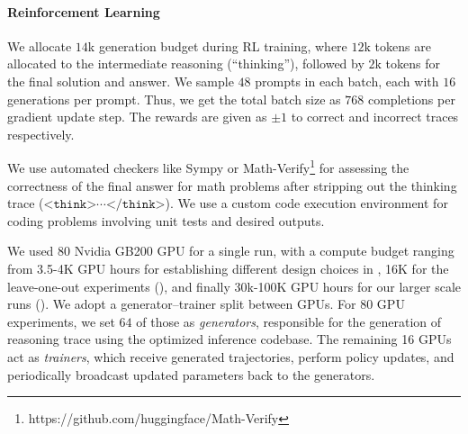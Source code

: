 \documentclass[]{fairmeta} %
\begin{document}
\paragraph{Reinforcement Learning}
We allocate $14$k generation budget during RL training, where $12\text{k}$ tokens are allocated to the intermediate reasoning (``thinking''), followed by $2\text{k}$ tokens for the final solution and answer. We sample $48$ prompts in each batch, each with $16$ generations per prompt. Thus, we get the total batch size as $768$ completions per gradient update step. The rewards are given as $\pm 1$ to correct and incorrect traces respectively.

We use automated checkers like Sympy \citep{meurer2017sympy} or Math-Verify\footnote{https://github.com/huggingface/Math-Verify} for assessing the correctness of the final answer for math problems after stripping out the thinking trace ($\texttt{<think>}\cdots\texttt{</think>}$). We use a custom code execution environment for coding problems involving unit tests and desired outputs.

We used 80 Nvidia GB200 GPU for a single run, with a compute budget ranging from 3.5-4K GPU hours for establishing different design choices in , 16K for the leave-one-out experiments (), and finally 30k-100K GPU hours for our larger scale runs (). We adopt a generator–trainer split between GPUs. For 80 GPU experiments, we set $64$ of those as \emph{generators}, responsible for the generation of reasoning trace using the optimized inference codebase. The remaining 16 GPUs act as \emph{trainers}, which receive generated trajectories, perform policy updates, and periodically broadcast updated parameters back to the generators.
\end{document}
